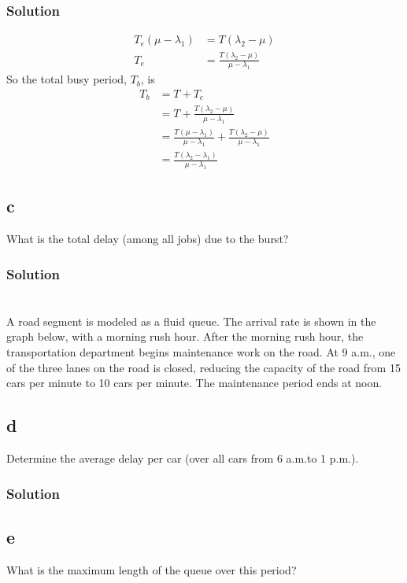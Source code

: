 \documentclass[letterpaper]{amsart}
\begin{document}
\subsubsection*{Solution}
\begin{align}
  T_e(\mu - \lambda_1) &= T(\lambda_2 - \mu) \\
  T_e &= \frac{T(\lambda_2 - \mu)}{\mu - \lambda_1}
\end{align}
So the total busy period, $T_b$, is
\begin{align}
  T_b &= T + T_e \\
  &= T + \frac{T(\lambda_2 - \mu)}{\mu-\lambda_1} \\
      &= \frac{T(\mu-\lambda_1)}{\mu-\lambda_1} + \frac{T(\lambda_2 - \mu)}{\mu-\lambda_1} \\
  &=\frac{T(\lambda_2-\lambda_1)}{\mu-\lambda_1}
\end{align}

\subsection*{c}
What is the total delay (among all jobs) due to the burst?

\subsubsection*{Solution}

\section{} %
A road segment is modeled as a fluid queue. The arrival rate is shown in the graph below,
with a morning rush hour. After the morning rush hour, the transportation department
begins maintenance work on the road. At 9 a.m., one of the three lanes on the road is
closed, reducing the capacity of the road from 15 cars per minute to 10 cars per minute.
The maintenance period ends at noon.
\subsection*{d}
Determine the average delay per car (over all cars from 6 a.m.to 1 p.m.).
\subsubsection*{Solution}
\subsection*{e}
What is the maximum length of the queue over this period?
\end{document}
